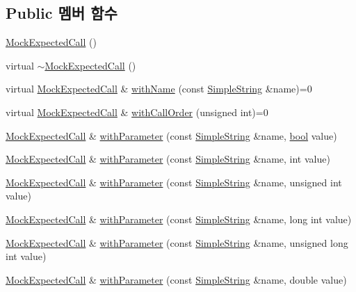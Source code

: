 \subsection*{Public 멤버 함수}
\begin{DoxyCompactItemize}
\item 
\hyperlink{class_mock_expected_call_ae5ec829873afcd1c039a35388b73ce60}{Mock\+Expected\+Call} ()
\item 
virtual \hyperlink{class_mock_expected_call_a9316b1d0f932f65af97c2942342f4357}{$\sim$\+Mock\+Expected\+Call} ()
\item 
virtual \hyperlink{class_mock_expected_call}{Mock\+Expected\+Call} \& \hyperlink{class_mock_expected_call_abf135af3296e97cbc816762a4eda1f9a}{with\+Name} (const \hyperlink{class_simple_string}{Simple\+String} \&name)=0
\item 
virtual \hyperlink{class_mock_expected_call}{Mock\+Expected\+Call} \& \hyperlink{class_mock_expected_call_a43dcbccaaaa39040ef754aa7e4523a26}{with\+Call\+Order} (unsigned int)=0
\item 
\hyperlink{class_mock_expected_call}{Mock\+Expected\+Call} \& \hyperlink{class_mock_expected_call_a9d735dfb585c1351650fcfad40f138bc}{with\+Parameter} (const \hyperlink{class_simple_string}{Simple\+String} \&name, \hyperlink{avb__gptp_8h_af6a258d8f3ee5206d682d799316314b1}{bool} value)
\item 
\hyperlink{class_mock_expected_call}{Mock\+Expected\+Call} \& \hyperlink{class_mock_expected_call_a8f249d5f2a770017be7a146ad4c28022}{with\+Parameter} (const \hyperlink{class_simple_string}{Simple\+String} \&name, int value)
\item 
\hyperlink{class_mock_expected_call}{Mock\+Expected\+Call} \& \hyperlink{class_mock_expected_call_a342cb778380da454c56e240fae0186be}{with\+Parameter} (const \hyperlink{class_simple_string}{Simple\+String} \&name, unsigned int value)
\item 
\hyperlink{class_mock_expected_call}{Mock\+Expected\+Call} \& \hyperlink{class_mock_expected_call_a0c84c6e3e39eef70254a71e4b7e275f8}{with\+Parameter} (const \hyperlink{class_simple_string}{Simple\+String} \&name, long int value)
\item 
\hyperlink{class_mock_expected_call}{Mock\+Expected\+Call} \& \hyperlink{class_mock_expected_call_adf4fe75932c7d2ce5f6ca5b4a8bece96}{with\+Parameter} (const \hyperlink{class_simple_string}{Simple\+String} \&name, unsigned long int value)
\item 
\hyperlink{class_mock_expected_call}{Mock\+Expected\+Call} \& \hyperlink{class_mock_expected_call_ab554906346659e0f70f7764ed1fd3f28}{with\+Parameter} (const \hyperlink{class_simple_string}{Simple\+String} \&name, double value)

\end{DoxyCompactItemize}
